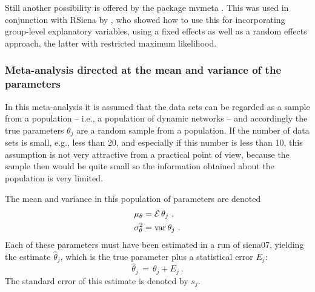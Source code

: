 \documentclass[a4paper,fleqn,11pt]{article}
\newcommand{\var}{\mbox{var}}
\newcommand{\+}{\, + \,}
\newcommand{\E}{\mbox{$\cal E$}}
\newcommand{\sfn}[1]{\textsf{#1}}
\newcommand{\RS}{{\sf \textsf{RSiena} }}
\begin{document}
Still another possibility is offered by the package \sfn{mvmeta}
\citep{Gasparrini2012}.
This was used in conjunction with \RS by
\citet{An2015}, who showed how to use this for incorporating
group-level explanatory variables, using a fixed effects
as well as a random effects approach, the latter with
restricted maximum likelihood.

\subsubsection{Meta-analysis directed at the mean
               and variance of the parameters}

In this meta-analysis it is assumed that the data sets can be
regarded as a sample from a population -- i.e., a population
of dynamic networks -- and accordingly the true parameters
$\theta_j$  are a random sample from a population.
If the number of data sets is small, e.g., less than 20,
and especially if this number is less than 10,
this assumption is not very attractive from a practical point of view,
because the sample then would be quite small
so the information obtained about the population is very limited.

The mean and variance in this population of parameters are denoted
\begin{align*}
 \mu_\theta &= \E\, \theta_j \ , \\
 \sigma^2_\theta &= \var\, \theta_j \ .
\end{align*}
Each of these parameters must have been estimated in a run of
\textsf{siena07}, yielding the estimate $\hat\theta_j$,
which is the true parameter plus a statistical error $E_j$:
\[
\hat\theta_j \,=\, \theta_j + E_j \ .
\]
The standard error of this estimate is denoted by $s_j$.
\end{document}
